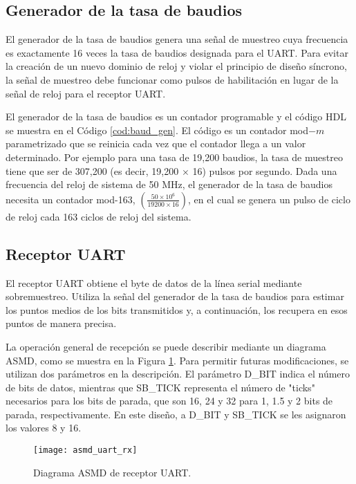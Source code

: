     \subsection{Generador de la tasa de baudios}

    El generador de la tasa de baudios genera una señal de muestreo cuya frecuencia es exactamente 16 veces la tasa de baudios designada para el UART. Para evitar la creación de un nuevo dominio de reloj y violar el principio de diseño síncrono, la señal de muestreo debe funcionar como pulsos de habilitación en lugar de la señal de reloj para el receptor UART.

    El generador de la tasa de baudios es un contador programable y el código HDL se muestra en el Código \ref{cod:baud_gen}. El código es un contador mod$-m$ parametrizado que se reinicia cada vez que el contador llega a un valor determinado. Por ejemplo para una tasa de 19,200 baudios, la tasa de muestreo tiene que ser de 307,200 (es decir, 19,200 $\times$ 16) pulsos por segundo. Dada una frecuencia del reloj de sistema de 50 MHz, el generador de la tasa de baudios necesita un contador mod-163, $\left( \frac{50 \times 10^{6}}{19200 \times 16} \right)$, en el cual se genera un pulso de ciclo de reloj cada 163 ciclos de reloj del sistema.

    \subsection{Receptor UART}

    El receptor UART obtiene el byte de datos de la línea serial mediante sobremuestreo. Utiliza la señal del generador de la tasa de baudios para estimar los puntos medios de los bits transmitidos y, a continuación, los recupera en esos puntos de manera precisa.
    
    La operación general de recepción se puede describir mediante un diagrama ASMD, como se muestra en la Figura \ref{fig:asmd_uart_rx}. Para permitir futuras modificaciones, se utilizan dos parámetros en la descripción. El parámetro D\_BIT indica el número de bits de datos, mientras que SB\_TICK representa el número de "ticks" necesarios para los bits de parada, que son 16, 24 y 32 para 1, 1.5 y 2 bits de parada, respectivamente. En este diseño, a D\_BIT y SB\_TICK se les asignaron los valores 8 y 16.

    \begin{figure}[hbtp]
      \centering
      \texttt{[image: asmd\_uart\_rx]}
      \caption{Diagrama ASMD de receptor UART.}
      \label{fig:asmd_uart_rx}
    \end{figure}

